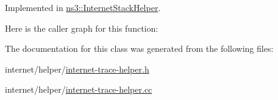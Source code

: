 Implemented in \hyperlink{classns3_1_1InternetStackHelper_aec9bacdd0e3902ad274270d914fdee23}{ns3\+::\+Internet\+Stack\+Helper}.



Here is the caller graph for this function\+:




The documentation for this class was generated from the following files\+:\begin{DoxyCompactItemize}
\item 
internet/helper/\hyperlink{internet-trace-helper_8h}{internet-\/trace-\/helper.\+h}\item 
internet/helper/\hyperlink{internet-trace-helper_8cc}{internet-\/trace-\/helper.\+cc}\end{DoxyCompactItemize}
